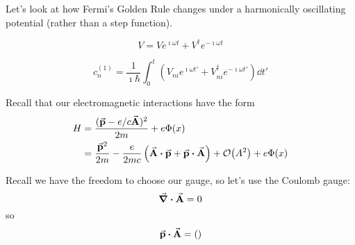 \documentclass[a4paper,twoside,master.tex]{subfiles}
\begin{document}

Let's look at how Fermi's Golden Rule changes under a harmonically oscillating potential (rather than a step function).

\begin{equation}
    V = V e^{\imath \omega t} + V^\dagger e^{- \imath \omega t}
\end{equation}

\begin{equation}
    c_n^{(1)} = \frac{1}{\imath \hbar} \int_0^t \left( V_{ni} e^{\imath \omega t'} + V_{ni}^\dagger e^{- \imath \omega t'} \right) \dd{t'}
\end{equation}

Recall that our electromagnetic interactions have the form
\begin{align}
    H &= \frac{(\va{p} - e/c \va{A})^2}{2m} + e \Phi(x) \\
    &= \frac{\va{p}^2}{2m} - \frac{e}{2mc} \left( \va{A} \vdot \va{p} + \va{p} \vdot \va{A} \right) + \order{A^2} + e \Phi(x)
\end{align}

Recall we have the freedom to choose our gauge, so let's use the Coulomb gauge:
\begin{equation}
    \div{\va{A}} = 0
\end{equation}
so
\begin{equation}
    \va{p} \vdot \va{A} = ()
\end{equation}
\end{document}
